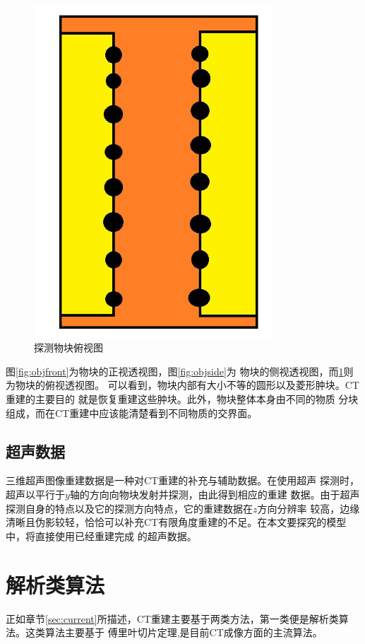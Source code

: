 \begin{figure}[h!]
\center
\includegraphics[width=0.8\textwidth]{figure/object/top}
\caption{探测物块俯视图}\label{fig:objtop}
\end{figure}
图\ref{fig:objfront}为物块的正视透视图，图\ref{fig:objside}为
物块的侧视透视图，而\ref{fig:objtop}则为物块的俯视透视图。
可以看到，物块内部有大小不等的圆形以及菱形肿块。CT重建的主要目的
就是恢复重建这些肿块。此外，物块整体本身由不同的物质
分块组成，而在CT重建中应该能清楚看到不同物质的交界面。

\subsection{超声数据}
三维超声图像重建数据是一种对CT重建的补充与辅助数据。在使用超声
探测时，超声以平行于$y$轴的方向向物块发射并探测，由此得到相应的重建
数据。由于超声探测自身的特点以及它的探测方向特点，它的重建数据在$z$方向分辨率
较高，边缘清晰且伪影较轻，恰恰可以补充CT有限角度重建的不足。在本文要探究的模型中，将直接使用已经重建完成
的超声数据。

\section{解析类算法}
正如章节\ref{sec:current}所描述，CT重建主要基于两类方法，第一类便是解析类算法。这类算法主要基于
傅里叶切片定理\cite{bracewell1986fourier},是目前CT成像方面的主流算法。
